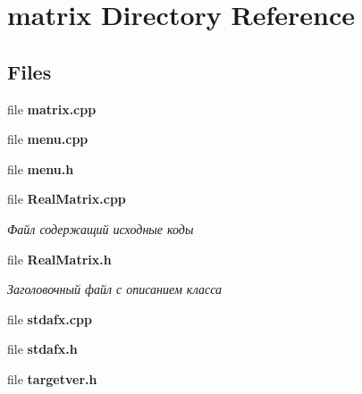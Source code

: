 \section{matrix Directory Reference}
\label{dir_109f68d84cef4a133396a0be144fa9b1}
\subsection*{Files}
\begin{DoxyCompactItemize}
\item 
file {\bfseries matrix.\+cpp}
\item 
file {\bfseries menu.\+cpp}
\item 
file {\bfseries menu.\+h}
\item 
file {\bf Real\+Matrix.\+cpp}
\begin{DoxyCompactList}\small\item\em Файл содержащий исходные коды \end{DoxyCompactList}\item 
file {\bf Real\+Matrix.\+h}
\begin{DoxyCompactList}\small\item\em Заголовочный файл с описанием класса \end{DoxyCompactList}\item 
file {\bfseries stdafx.\+cpp}
\item 
file {\bfseries stdafx.\+h}
\item 
file {\bfseries targetver.\+h}
\end{DoxyCompactItemize}
